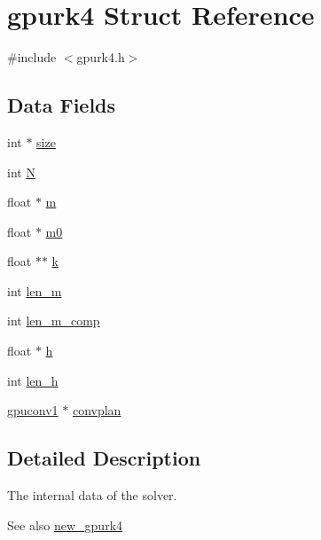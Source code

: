 \hypertarget{structgpurk4}{
\section{gpurk4 Struct Reference}
\label{structgpurk4}
}


{\ttfamily \#include $<$gpurk4.h$>$}

\subsection*{Data Fields}
\begin{DoxyCompactItemize}
\item 
int $\ast$ \hyperlink{structgpurk4_a3dfcc03cdbd85013cfd823100f6af00c}{size}
\item 
int \hyperlink{structgpurk4_a6e2799bb20efd235ac642e0426fa238b}{N}
\item 
float $\ast$ \hyperlink{structgpurk4_a6f8272391b99afdcf25f33c503e1e51e}{m}
\item 
float $\ast$ \hyperlink{structgpurk4_af278ba78d8285c823c8d4e1d235289c2}{m0}
\item 
float $\ast$$\ast$ \hyperlink{structgpurk4_a6248cd4b046b035ae9fcf1d73897305d}{k}
\item 
int \hyperlink{structgpurk4_a372a61c48e790fae18e9dd454e6dbe49}{len\_\-m}
\item 
int \hyperlink{structgpurk4_a24de106fa1f3355179e63f1930fef06b}{len\_\-m\_\-comp}
\item 
float $\ast$ \hyperlink{structgpurk4_a6571949e590edcfe1cb57c1763f83951}{h}
\item 
int \hyperlink{structgpurk4_a6a6691c189cb222b395f063cafa2eb42}{len\_\-h}
\item 
\hyperlink{structgpuconv1}{gpuconv1} $\ast$ \hyperlink{structgpurk4_a171baa3e8a5ae41da07eb35d6ec6cdac}{convplan}
\end{DoxyCompactItemize}


\subsection{Detailed Description}
The internal data of the solver. \begin{DoxySeeAlso}{See also}
\hyperlink{gpurk4_8h_a339d2f6d18a5d13a81fba70e6133ecb6}{new\_\-gpurk4} 
\end{DoxySeeAlso}


